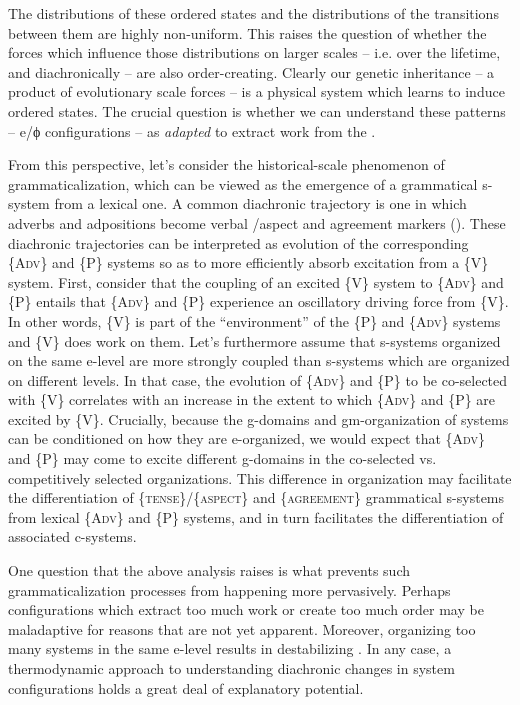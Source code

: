   The distributions of these ordered states and the distributions of the transitions between them are highly non-uniform. This raises the question of whether the forces which influence those distributions on larger scales -- i.e. over the lifetime, and diachronically -- are also order-creating. Clearly our genetic inheritance -- a product of evolutionary scale forces -- is a physical system which learns to induce ordered states. The crucial question is whether we can understand these patterns -- e/ϕ configurations -- as \textit{adapted} to extract work from the .

  From this perspective, let's consider the historical-scale phenomenon of grammaticalization, which can be viewed as the emergence of a grammatical s-system from a lexical one. A common diachronic trajectory is one in which adverbs and adpositions become verbal /aspect and agreement markers (\citealt{HeineKuteva2002,TraugottHeine1991}). These diachronic trajectories can be interpreted as evolution of the corresponding \{A\textsc{dv}\} and \{P\} systems so as to more efficiently absorb excitation from a \{V\} system. First, consider that the coupling of an excited \{V\} system to \{A\textsc{dv}\} and \{P\} entails that \{A\textsc{dv}\} and \{P\} experience an oscillatory driving force from \{V\}. In other words, \{V\} is part of the “environment” of the \{P\} and \{A\textsc{dv}\} systems and \{V\} does work on them. Let's furthermore assume that s-systems organized on the same e-level are more strongly coupled than s-systems which are organized on different levels. In that case, the evolution of \{A\textsc{dv}\} and \{P\} to be co-selected with \{V\} correlates with an increase in the extent to which \{A\textsc{dv}\} and \{P\} are excited by \{V\}. Crucially, because the g-domains and gm-organization of systems can be conditioned on how they are e-organized, we would expect that \{A\textsc{dv}\} and \{P\} may come to excite different g-domains in the co-selected vs. competitively selected organizations. This difference in organization may facilitate the differentiation of \{\textsc{tense}\}/\{\textsc{aspect}\} and \{\textsc{agreement}\} grammatical s-systems from lexical \{A\textsc{dv}\} and \{P\} systems, and in turn facilitates the differentiation of associated c-systems. 

One question that the above analysis raises is what prevents such grammaticalization processes from happening more pervasively. Perhaps configurations which extract too much work or create too much order may be maladaptive for reasons that are not yet apparent. Moreover, organizing too many systems in the same e-level results in destabilizing . In any case, a thermodynamic approach to understanding diachronic changes in system configurations holds a great deal of explanatory potential.

